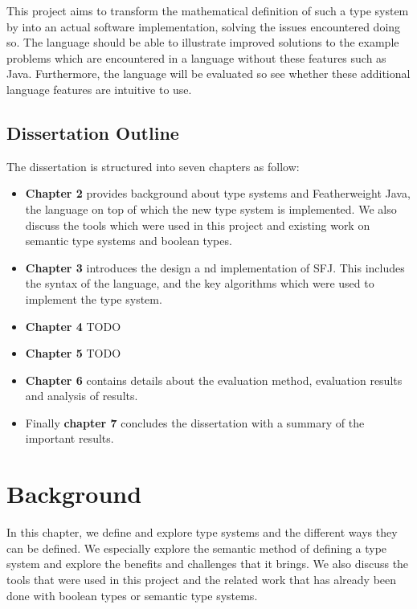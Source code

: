 \documentclass{l4proj}
\begin{document}
This project aims to transform the mathematical definition of such a type system by \citet{Dardha2017} into an actual software implementation, solving the issues encountered doing so.
The language should be able to illustrate improved solutions to the example problems which are encountered in a language without these features such as Java.
Furthermore, the language will be evaluated so see whether these additional language features are intuitive to use.

\section{Dissertation Outline}

The dissertation is structured into seven chapters as follow:

\begin{itemize}
    \item
          \textbf{Chapter 2} provides background about type systems and Featherweight Java, the language on top of which the new type system is implemented.
          We also discuss the tools which were used in this project and existing work on semantic type systems and boolean types.
    \item
          \textbf{Chapter 3} introduces the design a    nd implementation of SFJ. This includes the syntax of the language, and the key algorithms which were used to implement the type system.
    \item
          \textbf{Chapter 4} TODO
    \item
          \textbf{Chapter 5} TODO
    \item
          \textbf{Chapter 6} contains details about the evaluation method, evaluation results and analysis of results.
    \item
          Finally \textbf{chapter 7} concludes the dissertation with a summary of the important results.
\end{itemize}


\chapter{Background}

In this chapter, we define and explore type systems and the different ways they can be defined. We especially explore the semantic method of defining a type system and explore the benefits and challenges that it brings. We also discuss the tools that were used in this project and the related work that has already been done with boolean types or semantic type systems.
\end{document}
